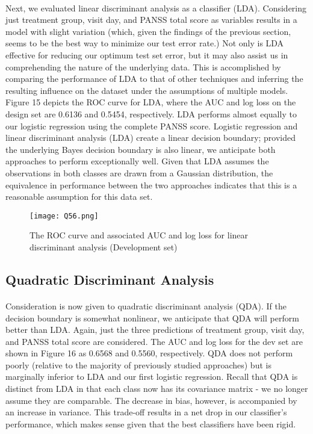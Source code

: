 \documentclass{article}
\begin{document}
 	\paragraph{}Next, we evaluated linear discriminant analysis as a classifier (LDA). Considering just treatment group, visit day, and PANSS total score as variables results in a model with slight variation (which, given the findings of the previous section, seems to be the best way to minimize our test error rate.) Not only is LDA effective for reducing our optimum test set error, but it may also assist us in comprehending the nature of the underlying data. This is accomplished by comparing the performance of LDA to that of other techniques and inferring the resulting influence on the dataset under the assumptions of multiple models. Figure 15 depicts the ROC curve for LDA, where the AUC and log loss on the design set are 0.6136 and 0.5454, respectively. LDA performs almost equally to our logistic regression using the complete PANSS score. Logistic regression and linear discriminant analysis (LDA) create a linear decision boundary; provided the underlying Bayes decision boundary is also linear, we anticipate both approaches to perform exceptionally well. Given that LDA assumes the observations in both classes are drawn from a Gaussian distribution, the equivalence in performance between the two approaches indicates that this is a reasonable assumption for this data set.
 	 \begin{figure}[H] 
\centering %
\texttt{[image: Q56.png]} 
\caption{ The ROC curve and associated AUC and log loss for linear discriminant analysis (Development set)}
\label{R} %
\end{figure} 
 	
 	
 	
 	\subsection{Quadratic Discriminant Analysis}
 	\paragraph{}Consideration is now given to quadratic discriminant analysis (QDA). If the decision boundary is somewhat nonlinear, we anticipate that QDA will perform better than LDA. Again, just the three predictions of treatment group, visit day, and PANSS total score are considered. The AUC and log loss for the dev set are shown in Figure 16 as 0.6568 and 0.5560, respectively. QDA does not perform poorly (relative to the majority of previously studied approaches) but is marginally inferior to LDA and our first logistic regression. Recall that QDA is distinct from LDA in that each class now has its covariance matrix - we no longer assume they are comparable. The decrease in bias, however, is accompanied by an increase in variance. This trade-off results in a net drop in our classifier's performance, which makes sense given that the best classifiers have been rigid.
 	
\end{document}
